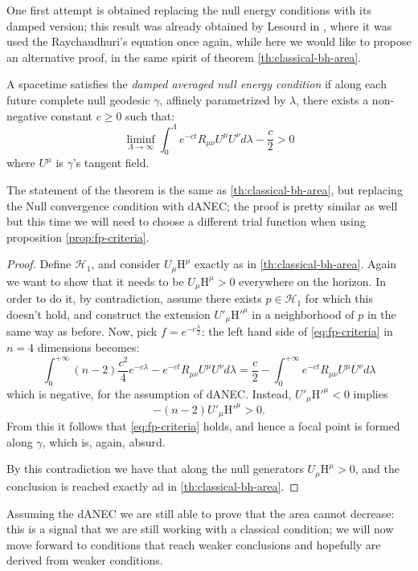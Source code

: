 One first attempt is obtained replacing the null energy conditions with its damped version; this result was already obtained by Lesourd in \cite{lesourd2018remark}, where it was used the Raychaudhuri's equation once again, while here we would like to propose an alternative proof, in the same spirit of theorem \ref{th:classical-bh-area}.
\begin{definition}
	A spacetime satisfies the \emph{damped averaged null energy condition} if along each future complete null geodesic \(\gamma\), affinely parametrized by \(\lambda\), there exists a non-negative constant \(c\ge 0\) such that:
	\[
	\liminf\limits_{\Lambda\rightarrow \infty} \int_{0}^{\Lambda} e^{-ct}R_{\mu\nu}U^{\mu}U^{\nu}d\lambda - \frac{c}{2} > 0
	\]
	where \(U^{\mu}\) is \(\gamma\)'s tangent field.
\end{definition}

The statement of the theorem is the same as \ref{th:classical-bh-area}, but replacing the Null convergence condition with dANEC; the proof is pretty similar as well but this time we will need to choose a different trial function when using proposition \ref{prop:fp-criteria}.
\begin{proof}
	Define \(\mathscr{H}_1\), and consider \(U_{\mu}\mathrm{H}^{\mu}\) exactly as in \ref{th:classical-bh-area}. Again we want to show that it needs to be \(U_{\mu}\mathrm{H}^{\mu} > 0\) everywhere on the horizon. In order to do it, by contradiction, assume there exists \(p\in \mathscr{H}_1\) for which this doesn't hold, and construct the extension \(U'_{\mu}\mathrm{H}'^{\mu}\) in a neighborhood of \(p\) in the same way as before.
	Now, pick \(f = e^{-c\frac{\lambda}{2}}\): the left hand side of \ref{eq:fp-criteria} in \(n = 4\) dimensions becomes:
	\[
	\int_{0}^{+\infty} (n-2)\frac{c^2}{4} e^{-c\lambda} - e^{-ct}R_{\mu\nu}U^{\mu}U^{\nu}d\lambda = \frac{c}{2} - \int_{0}^{+\infty} e^{-ct}R_{\mu\nu}U^{\mu}U^{\nu}d\lambda 
	\]
	which is negative, for the assumption of dANEC.
	Instead, \(U'_{\mu}\mathrm{H}'^{\mu} < 0 \) implies
	\[
	-(n - 2)U'_{\mu}\mathrm{H}'^{\mu} > 0.
	\]
	From this it follows that \ref{eq:fp-criteria} holds, and hence  a focal point is formed along \(\gamma\), which is, again, absurd. 
	
	By this contradiction we have that along the null generators \(U_{\mu}\mathrm{H}^{\mu} > 0\), and the conclusion is reached exactly ad in \ref{th:classical-bh-area}.
\end{proof}

Assuming the dANEC we are still able to prove that the area cannot decrease: this is a signal that we are still working with a classical condition; we will now move forward to conditions that reach weaker conclusions and hopefully are derived from weaker conditions.


